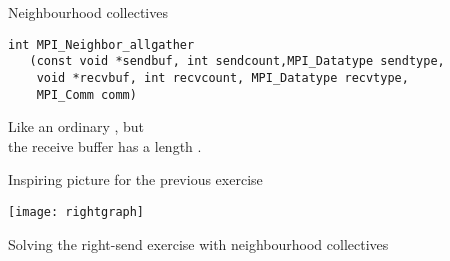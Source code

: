\begin{frame}[containsverbatim]{Neighbourhood collectives}
\begin{lstlisting}
int MPI_Neighbor_allgather
   (const void *sendbuf, int sendcount,MPI_Datatype sendtype,
    void *recvbuf, int recvcount, MPI_Datatype recvtype,
    MPI_Comm comm)
\end{lstlisting}
Like an ordinary , but\\
the receive buffer has a length .
\end{frame}

\begin{exerciseframe}[rightgraph]
  
\end{exerciseframe}

\begin{frame}{Inspiring picture for the previous exercise}
  \label{fig:rightgraph}

  \texttt{[image: rightgraph]}

  Solving the right-send exercise with neighbourhood
  collectives
\end{frame}

\endinput

\begin{frame}[containsverbatim]{}
\end{frame}

